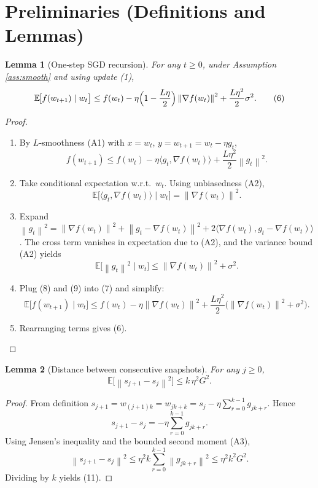 \documentclass{article}
\newtheorem{lemma}{Lemma}
\newcommand{\E}{\mathbb{E}}
\newcommand{\norm}[1]{\left\lVert #1\right\rVert}
\begin{document}
\section*{Preliminaries (Definitions and Lemmas)}
\begin{lemma}[One‑step SGD recursion]\label{lem:sgd}
For any $t\ge0$, under Assumption \ref{ass:smooth} and using update (1),
\[
    \E\!\bigl[f(w_{t+1})\mid w_t\bigr]
    \le f(w_t)-\eta\Bigl(1-\frac{L\eta}{2}\Bigr)\norm{\nabla f(w_t)}^2
          +\frac{L\eta^2}{2}\sigma^2 .
\tag{6}
\]
\end{lemma}
\begin{proof}
\begin{enumerate}[label=[Step \arabic*]]
    \item By $L$‑smoothness (A1) with $x=w_t$, $y=w_{t+1}=w_t-\eta g_t$,
    \[
        f(w_{t+1})\le f(w_t)-\eta\langle g_t,\nabla f(w_t)\rangle
                    +\frac{L\eta^2}{2}\norm{g_t}^2 .
    \tag{7}
    \]
    \item Take conditional expectation w.r.t.\ $w_t$.
    Using unbiasedness (A2),
    \[
        \E\!\bigl[\langle g_t,\nabla f(w_t)\rangle\mid w_t\bigr]
        =\norm{\nabla f(w_t)}^2 .
    \tag{8}
    \]
    \item Expand $\norm{g_t}^2=\norm{\nabla f(w_t)}^2+\norm{g_t-\nabla f(w_t)}^2+2\langle\nabla f(w_t),g_t-\nabla f(w_t)\rangle$.
    The cross term vanishes in expectation due to (A2), and the variance bound (A2) yields
    \[
        \E\!\bigl[\norm{g_t}^2\mid w_t\bigr]\le
        \norm{\nabla f(w_t)}^2+\sigma^2 .
    \tag{9}
    \]
    \item Plug (8) and (9) into (7) and simplify:
    \[
        \E\!\bigl[f(w_{t+1})\mid w_t\bigr]
        \le f(w_t)-\eta\norm{\nabla f(w_t)}^2
           +\frac{L\eta^2}{2}\bigl(\norm{\nabla f(w_t)}^2+\sigma^2\bigr).
    \tag{10}
    \]
    \item Rearranging terms gives (6).
\end{enumerate}
\end{proof}

\begin{lemma}[Distance between consecutive snapshots]\label{lem:snapdist}
For any $j\ge0$,
\[
    \E\!\bigl[\norm{s_{j+1}-s_j}^2\bigr]\le k\,\eta^2 G^2 .
\tag{11}
\]
\end{lemma}
\begin{proof}
From definition $s_{j+1}=w_{(j+1)k}=w_{jk+k}=s_j-\eta\sum_{r=0}^{k-1}g_{jk+r}$.
Hence
\[
    s_{j+1}-s_j=-\eta\sum_{r=0}^{k-1}g_{jk+r}.
\]
Using Jensen’s inequality and the bounded second moment (A3),
\[
    \norm{s_{j+1}-s_j}^2
    \le \eta^2 k\sum_{r=0}^{k-1}\norm{g_{jk+r}}^2
    \le \eta^2 k^2 G^2 .
\]
Dividing by $k$ yields (11). \qedhere
\end{proof}
\end{document}
